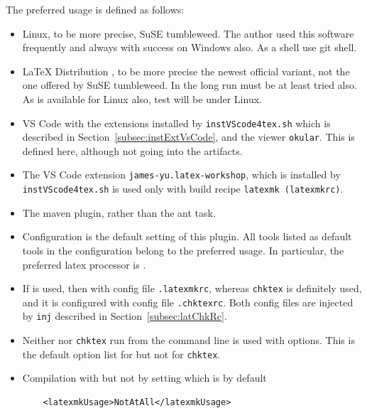 The preferred usage is defined as follows: 
%
\begin{itemize}
  \item Linux, to be more precise, SuSE tumbleweed. 
  The author used this software frequently and always with success on Windows also. 
  As a shell use git shell. 
  \item \LaTeX{} Distribution \texlive, to be more precise the newest official variant, 
  not the one offered by SuSE tumbleweed. 
  In the long run \miktex{} must be at least tried also. 
  As \miktex{} is available for Linux also, test will be under Linux. 
  \item 
  VS Code with the extensions installed by \texttt{instVScode4tex.sh} 
  which is described in Section~\ref{subsec:instExtVsCode}, 
  and the viewer \texttt{okular}. 
  This is defined here, although not going into the artifacts. 
  \item The VS Code extension \texttt{james-yu.latex-workshop}, 
  which is installed by \texttt{instVScode4tex.sh} is used only with build recipe 
  \texttt{latexmk (latexmkrc)}. 
  \item The maven plugin, rather than the ant task. 
  \item Configuration is the default setting of this plugin. 
  All tools listed as default tools in the configuration belong to the preferred usage. 
  In particular, the preferred latex processor is \lualatex. 
  \item If  is used, then with config file \texttt{.latexmkrc}, 
  whereas \texttt{chktex} is definitely used, 
  and it is configured with config file \texttt{.chktexrc}. 
  Both config files are injected by \texttt{inj} described in Section~\ref{subsec:latChkRc}. 
  \item Neither  nor \texttt{chktex} run from the command line is used with options. 
  This is the default option list for  but not for \texttt{chktex}. 
  \item Compilation with  but not by setting which is by default 
  \begin{verbatim}
    <latexmkUsage>NotAtAll</latexmkUsage>
  \end{verbatim}

\end{itemize}
